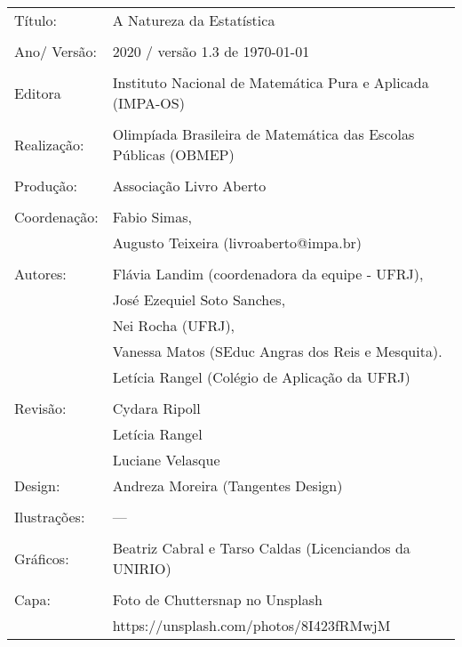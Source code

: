 \begin{tabular}{p{}p{}}
Título: & A Natureza da Estatística\\
\\
Ano/ Versão: & 2020 / versão 1.3 de \today\\
\\
Editora & Instituto Nacional de Matem\'atica Pura e Aplicada (IMPA-OS)\\
\\
Realização:& Olimp\'iada Brasileira de Matem\'atica das Escolas P\'ublicas (OBMEP)\\
\\
Produção:& Associação Livro Aberto\\
\\
Coordenação: & Fabio Simas, \\
             & Augusto Teixeira (livroaberto@impa.br)\\
\\
  Autores: & Flávia Landim (coordenadora da equipe - UFRJ),\\
        & José Ezequiel Soto Sanches,\\
        & Nei Rocha (UFRJ),\\
             & Vanessa Matos (SEduc Angras dos Reis e Mesquita).\\
             & Letícia Rangel (Colégio de Aplicação da UFRJ)\\
\\
Revisão: & Cydara Ripoll  \\
		     & Letícia Rangel \\
         & Luciane Velasque
\\
Design: & Andreza Moreira (Tangentes Design) \\
\\
  Ilustrações: & --- \\ 
\\
Gráficos: & Beatriz Cabral e Tarso Caldas (Licenciandos da UNIRIO)\\
\\
  Capa: & Foto de Chuttersnap no Unsplash \\
        & https://unsplash.com/photos/8I423fRMwjM \\

\end{tabular}
\vfill


